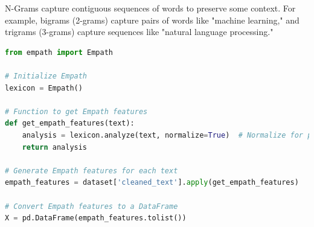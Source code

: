 \noindent
N-Grams capture contiguous sequences of words to preserve some context. For example, bigrams (2-grams) capture pairs of words like "machine learning," and trigrams (3-grams) capture sequences like "natural language processing."

\begin{tcolorbox}[colback=gray!5!white, colframe=gray!80!black, boxrule=0.5pt, title=LIWC (Empath)]
\begin{lstlisting}[language=Python]
from empath import Empath

# Initialize Empath
lexicon = Empath()

# Function to get Empath features
def get_empath_features(text):
    analysis = lexicon.analyze(text, normalize=True)  # Normalize for proportions
    return analysis

# Generate Empath features for each text
empath_features = dataset['cleaned_text'].apply(get_empath_features)

# Convert Empath features to a DataFrame
X = pd.DataFrame(empath_features.tolist())
\end{lstlisting}
\end{tcolorbox}

